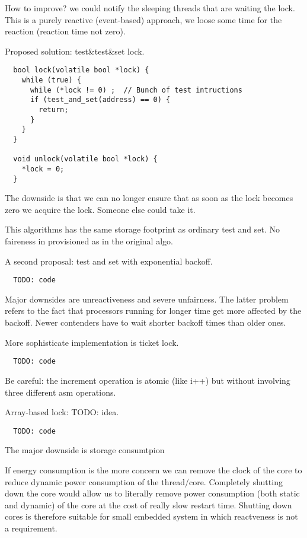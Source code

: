 How to improve? we could notify the sleeping threads that are waiting the lock.
This is a purely reactive (event-based) approach, we loose some time for the reaction (reaction time not zero).

Proposed solution: test&test&set lock.
\begin{verbatim}
  bool lock(volatile bool *lock) {
    while (true) {
      while (*lock != 0) ;  // Bunch of test intructions
      if (test_and_set(address) == 0) {
        return;
      }
    }
  }

  void unlock(volatile bool *lock) {
    *lock = 0;
  }
\end{verbatim}

The downside is that we can no longer ensure that as soon as the lock becomes zero we acquire the lock. Someone else could take it.

This algorithms has the same storage footprint as ordinary test and set. No faireness in provisioned as in the original algo.

A second proposal: test and set with exponential backoff.
\begin{verbatim}
  TODO: code
\end{verbatim}

Major downsides are unreactiveness and severe unfairness.
The latter problem refers to the fact that processors running for longer time get more affected by the backoff.
Newer contenders have to wait shorter backoff times than older ones.

More sophisticate implementation is ticket lock.
\begin{verbatim}
  TODO: code
\end{verbatim}

Be careful: the increment operation is atomic (like i++) but without involving three different asm operations.

Array-based lock: TODO: idea.
\begin{verbatim}
  TODO: code
\end{verbatim}

The major downside is storage consumtpion

If energy consumption is the more concern we can remove the clock of the core to reduce dynamic power consumption of the thread/core.
Completely shutting down the core would allow us to literally remove power consumption (both static and dynamic) of the core at the cost of really slow restart time.
Shutting down cores is therefore suitable for small embedded system in which reactveness is not a requirement.


